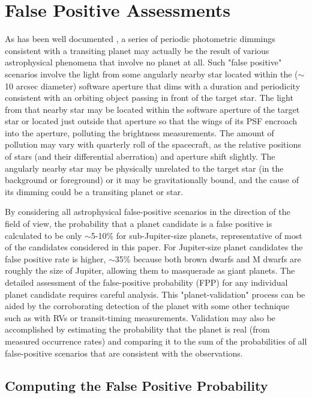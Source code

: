 \documentclass{emulateapj}
\begin{document}
\section{False Positive Assessments}
\label{sec:fpp1}

As has been well documented \citep{Torres2011}, a series of periodic
 photometric dimmings consistent with a transiting planet may actually
 be the result of various astrophysical phenomena that involve no
 planet at all.  Such "false positive" scenarios involve the light
 from some angularly nearby star located within the ($\sim$10 arcsec
 diameter) \ek software aperture that dims with a duration and
 periodicity consistent with an orbiting object passing in front of
 the target star.  The light from that nearby star may be located
 within the software aperture of the target star or located just
 outside that aperture so that the wings of its PSF encroach into the
 aperture, polluting the brightness measurements.  The amount of
 pollution may vary with quarterly roll of the spacecraft, as the
 relative positions of stars (and their differential aberration) and
 aperture shift slightly.  The angularly nearby star may be physically
 unrelated to the target star (in the background or foreground) or it
 may be gravitationally bound, and the cause of its dimming could be a
 transiting planet or star.

By considering all astrophysical false-positive scenarios in the
 direction of the \ek field of view, the probability that a planet
 candidate is a false positive is calculated to be only $\sim$5-10\%
 \citep{Morton_Johnson2011, Fressin2013} for sub-Jupiter-size planets,
 representative of most of the candidates considered in this paper.
  For Jupiter-size planet candidates the false positive rate is
 higher, $\sim$35\% \citep{Santerne2012, Fressin2013} because both
 brown dwarfs and M dwarfs are roughly the size of Jupiter, allowing
 them to masquerade as giant planets.  The detailed assessment of the
 false-positive probability (FPP) for any individual planet candidate
 requires careful analysis.  This "planet-validation" process can be
 aided by the corroborating detection of the planet with some other
 technique such as with RVs or transit-timing measurements. Validation
 may also be accomplished by estimating the probability that the
 planet is real (from measured occurrence rates) and comparing it to
 the sum of the probabilities of all false-positive scenarios that are
 consistent with the observations.

\subsection{Computing the False Positive Probability}
\label{sec:fpp2}
\end{document}
